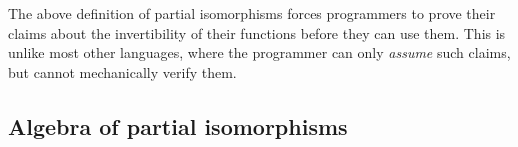\documentclass[12pt,a4paper,twoside,openright]{report}
\begin{document}
\begin{code}
\> \AgdaSymbol{:} \AgdaSymbol{\{}  \AgdaSymbol{:} \AgdaSymbol{\}}        \<%
\\
\> \AgdaSymbol{(} \AgdaInductiveConstructor{,}    \AgdaInductiveConstructor{,}  \AgdaSymbol{)} \AgdaSymbol{=}  \AgdaInductiveConstructor{,}    \AgdaInductiveConstructor{,}  \<%
\\
%
\\
\> \AgdaSymbol{:} \AgdaSymbol{\{}  \AgdaSymbol{:} \AgdaSymbol{\}}         \<%
\\
\> \AgdaSymbol{(} \AgdaInductiveConstructor{,} \AgdaSymbol{\_}  \AgdaSymbol{\_} \AgdaSymbol{)} \AgdaSymbol{=} \<%
\\
%
\\
\> \AgdaSymbol{:} \AgdaSymbol{\{}  \AgdaSymbol{:} \AgdaSymbol{\}}         \<%
\\
\> \AgdaSymbol{(\_} \AgdaInductiveConstructor{,}   \AgdaSymbol{\_} \AgdaSymbol{)} \AgdaSymbol{=} \<%
\end{code}

The above definition of partial isomorphisms forces programmers to prove their claims about the invertibility of their functions before they can use them. This is unlike most other languages, where the programmer can only \emph{assume} such claims, but cannot mechanically verify them.

\subsection{Algebra of partial isomorphisms} \label{isoalg}
\end{document}
